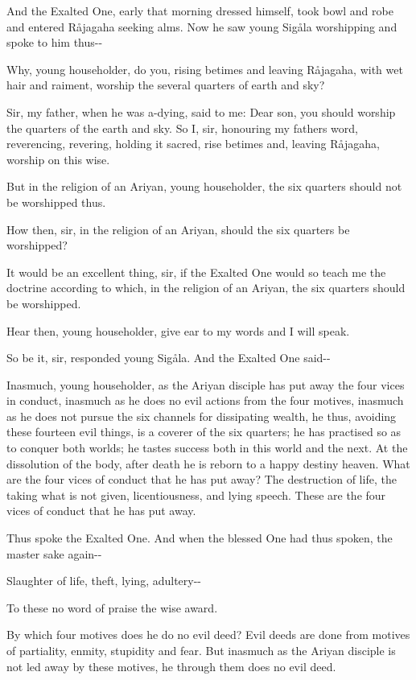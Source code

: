 \documentclass[12pt,twoside]{article}
\begin{document}
And the Exalted One, early that morning dressed himself, took bowl and
robe and entered R{\aa}jagaha seeking alms. Now he saw young Sig{\aa}la
worshipping and spoke to him thus{}-{}-

Why, young householder, do you, rising betimes and leaving R{\aa}jagaha,
with wet hair and raiment, worship the several quarters of earth and
sky?

Sir, my father, when he was a{}-dying, said to me: Dear son, you should
worship the quarters of the earth and sky. So I, sir, honouring my
father{\textquotesingle}s word, reverencing, revering, holding it
sacred, rise betimes and, leaving R{\aa}jagaha, worship on this wise.

But in the religion of an Ariyan, young householder, the six quarters
should not be worshipped thus.

How then, sir, in the religion of an Ariyan, should the six quarters be
worshipped?

It would be an excellent thing, sir, if the Exalted One would so teach
me the doctrine according to which, in the religion of an Ariyan, the
six quarters should be worshipped.

Hear then, young householder, give ear to my words and I will speak.

So be it, sir, responded young Sig{\aa}la. And the Exalted One
said{}-{}-

Inasmuch, young householder, as the Ariyan disciple has put away the
four vices in conduct, inasmuch as he does no evil actions from the
four motives, inasmuch as he does not pursue the six channels for
dissipating wealth, he thus, avoiding these fourteen evil things, is a
coverer of the six quarters; he has practised so as to conquer both
worlds; he tastes success both in this world and the next. At the
dissolution of the body, after death he is reborn to a happy destiny
heaven. What are the four vices of conduct that he has put away? The
destruction of life, the taking what is not given, licentiousness, and
lying speech. These are the four vices of conduct that he has put away.

Thus spoke the Exalted One. And when the blessed One had thus spoken,
the master sake again{}-{}-


\bigskip

Slaughter of life, theft, lying, adultery{}-{}-

To these no word of praise the wise award.


\bigskip

By which four motives does he do no evil deed? Evil deeds are done from
motives of partiality, enmity, stupidity and fear. But inasmuch as the
Ariyan disciple is not led away by these motives, he through them does
no evil deed.
\end{document}
